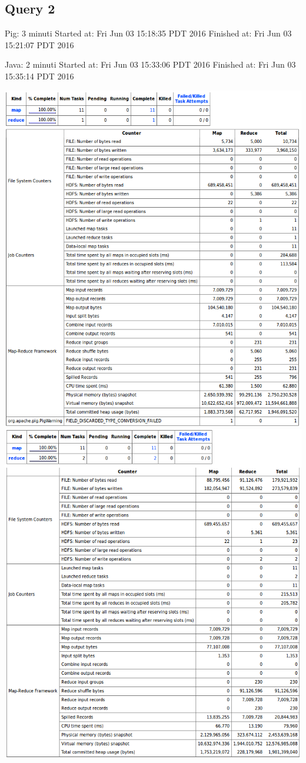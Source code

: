 \documentclass[11pt]{article} %
\begin{document}
\subsection{Query 2}
Pig: 3 minuti	 Started at: Fri Jun 03 15:18:35 PDT 2016	 Finished at: Fri Jun 03 15:21:07 PDT 2016

Java: 2 minuti	 Started at: Fri Jun 03 15:33:06 PDT 2016	 Finished at: Fri Jun 03 15:35:14 PDT 2016

\includegraphics[scale=0.8]{pig2.png}
\includegraphics[scale=0.8]{java2.png}
\end{document}
